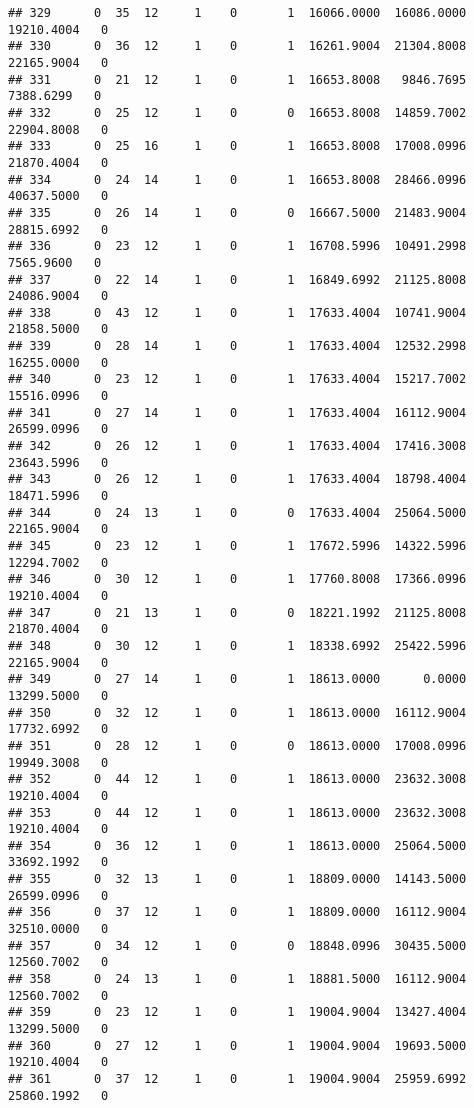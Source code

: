 \documentclass[
]{article}
\begin{document}
\begin{enumerate}
\begin{verbatim}
## 329      0  35  12     1    0       1  16066.0000  16086.0000  19210.4004   0
## 330      0  36  12     1    0       1  16261.9004  21304.8008  22165.9004   0
## 331      0  21  12     1    0       1  16653.8008   9846.7695   7388.6299   0
## 332      0  25  12     1    0       0  16653.8008  14859.7002  22904.8008   0
## 333      0  25  16     1    0       1  16653.8008  17008.0996  21870.4004   0
## 334      0  24  14     1    0       1  16653.8008  28466.0996  40637.5000   0
## 335      0  26  14     1    0       0  16667.5000  21483.9004  28815.6992   0
## 336      0  23  12     1    0       1  16708.5996  10491.2998   7565.9600   0
## 337      0  22  14     1    0       1  16849.6992  21125.8008  24086.9004   0
## 338      0  43  12     1    0       1  17633.4004  10741.9004  21858.5000   0
## 339      0  28  14     1    0       1  17633.4004  12532.2998  16255.0000   0
## 340      0  23  12     1    0       1  17633.4004  15217.7002  15516.0996   0
## 341      0  27  14     1    0       1  17633.4004  16112.9004  26599.0996   0
## 342      0  26  12     1    0       1  17633.4004  17416.3008  23643.5996   0
## 343      0  26  12     1    0       1  17633.4004  18798.4004  18471.5996   0
## 344      0  24  13     1    0       0  17633.4004  25064.5000  22165.9004   0
## 345      0  23  12     1    0       1  17672.5996  14322.5996  12294.7002   0
## 346      0  30  12     1    0       1  17760.8008  17366.0996  19210.4004   0
## 347      0  21  13     1    0       0  18221.1992  21125.8008  21870.4004   0
## 348      0  30  12     1    0       1  18338.6992  25422.5996  22165.9004   0
## 349      0  27  14     1    0       1  18613.0000      0.0000  13299.5000   0
## 350      0  32  12     1    0       1  18613.0000  16112.9004  17732.6992   0
## 351      0  28  12     1    0       0  18613.0000  17008.0996  19949.3008   0
## 352      0  44  12     1    0       1  18613.0000  23632.3008  19210.4004   0
## 353      0  44  12     1    0       1  18613.0000  23632.3008  19210.4004   0
## 354      0  36  12     1    0       1  18613.0000  25064.5000  33692.1992   0
## 355      0  32  13     1    0       1  18809.0000  14143.5000  26599.0996   0
## 356      0  37  12     1    0       1  18809.0000  16112.9004  32510.0000   0
## 357      0  34  12     1    0       0  18848.0996  30435.5000  12560.7002   0
## 358      0  24  13     1    0       1  18881.5000  16112.9004  12560.7002   0
## 359      0  23  12     1    0       1  19004.9004  13427.4004  13299.5000   0
## 360      0  27  12     1    0       1  19004.9004  19693.5000  19210.4004   0
## 361      0  37  12     1    0       1  19004.9004  25959.6992  25860.1992   0

\end{verbatim}
\end{enumerate}
\end{document}
